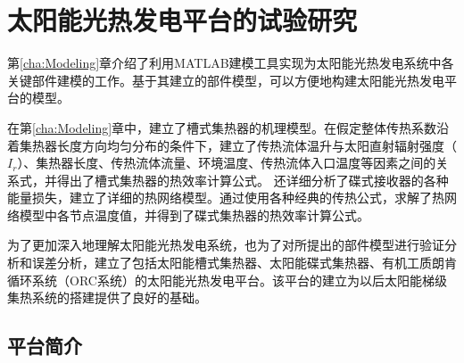 \chapter{太阳能光热发电平台的试验研究}

第\ref{cha:Modeling}章介绍了利用MATLAB建模工具实现为太阳能光热发电系统中各关键部件建模的工作。基于其建立的部件模型，可以方便地构建太阳能光热发电平台的模型。

在第\ref{cha:Modeling}章中，建立了槽式集热器的机理模型。在假定整体传热系数沿着集热器长度方向均匀分布的条件下，建立了传热流体温升与太阳直射辐射强度（$I_r$）、集热器长度、传热流体流量、环境温度、传热流体入口温度等因素之间的关系式，并得出了槽式集热器的热效率计算公式。
还详细分析了碟式接收器的各种能量损失，建立了详细的热网络模型。通过使用各种经典的传热公式，求解了热网络模型中各节点温度值，并得到了碟式集热器的热效率计算公式。

为了更加深入地理解太阳能光热发电系统，也为了对所提出的部件模型进行验证分析和误差分析，建立了包括太阳能槽式集热器、太阳能碟式集热器、有机工质朗肯循环系统（ORC系统）的太阳能光热发电平台。该平台的建立为以后太阳能梯级集热系统的搭建提供了良好的基础。

\section{平台简介}

